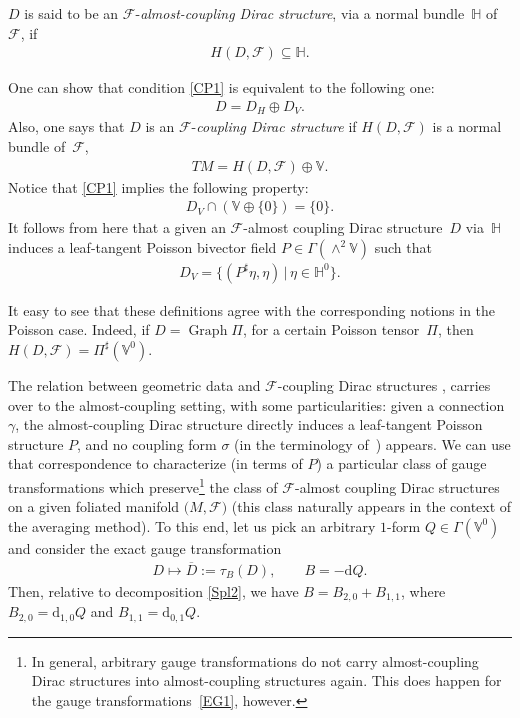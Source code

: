 \documentclass[pdftex]{sigma}
\numberwithin{equation}{section}
\begin{document}
\begin{Definition}
$D$ is said to be an $\mathcal{F}$-\emph{almost-coupling Dirac structure}, via a normal bundle~$\mathbb{H}$ of~$\mathcal{F}$, if \begin{gather}\label{CP1}
H(D,\mathcal{F})\subseteq\mathbb{H}.
\end{gather}
\end{Definition}

One can show that condition \eqref{CP1} is equivalent to the following one:
\begin{gather*}%
D=D_{H}\oplus D_{V}.
\end{gather*}
Also, one says that $D$ is an $\mathcal{F}$-\emph{coupling Dirac structure} \cite{Va-06,Wa} if $H(D,\mathcal{F})$ is a normal bundle of~$\mathcal{F}$,
\begin{gather*}
TM=H(D,\mathcal{F})\oplus\mathbb{V}.
\end{gather*}
Notice that \eqref{CP1} implies the following property:
\begin{gather*}
D_{V}\cap(\mathbb{V}\oplus\{0\})=\{0\}.
\end{gather*}
It follows from here that a given an $\mathcal{F}$-almost coupling Dirac structure~$D$ via~$\mathbb{H}$ induces a leaf-tangent Poisson bivector f\/ield $P\in\Gamma(\wedge^{2}\mathbb{V})$ such that
\begin{gather}
D_{V}=\big\{(P^{\sharp}\eta,\eta)\,|\,\eta\in\mathbb{H}^{0}\big\}.\label{NEW}
\end{gather}
\begin{Remark}
It easy to see that these def\/initions agree with the corresponding notions in the Poisson case. Indeed, if $D=\operatorname*{Graph}\Pi$, for a certain Poisson tensor~$\Pi$, then $H(D,\mathcal{F})=\Pi^{\sharp}(\mathbb{V}^{0})$.
\end{Remark}

The relation between geometric data and $\mathcal{F}$-coupling Dirac structures \cite{Va-06,JVYV-14,Wa}, carries over to the almost-coupling setting, with some particularities: given a connection~$\gamma$, the almost-coupling Dirac structure directly induces a leaf-tangent Poisson structure $P$, and no coupling form $\sigma$ (in the terminology of~\cite{JVYV-14}) appears. We can use that correspondence to characterize (in terms of $P$) a particular class of gauge transformations which preserve\footnote{In general, arbitrary gauge transformations do not carry almost-coupling Dirac
structures into almost-coupling structures again. This does happen for the gauge transformations~\eqref{EG1}, however.} the class of $\mathcal{F}$-almost coupling Dirac structures on a given foliated manifold $(M,\mathcal{F)}$ (this class naturally appears in the context of the
averaging method). To this end, let us pick an arbitrary $1$-form $Q\in\Gamma(\mathbb{V}^{0})$ and consider the exact gauge transformation
\begin{gather}\label{EG1}
D\mapsto\overline{D}:=\tau_{B}(D),\qquad B=-\mathrm{d}Q.
\end{gather}
Then, relative to decomposition \eqref{Spl2}, we have $B=B_{2,0}+B_{1,1}$, where $B_{2,0}=\mathrm{d}_{1,0}Q$ and $B_{1,1}=\mathrm{d}_{0,1}Q$.
\end{document}
